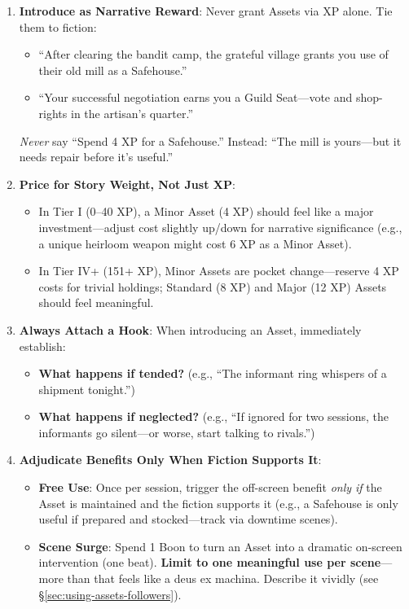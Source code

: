 \begin{enumerate}
  \item \textbf{Introduce as Narrative Reward}: Never grant Assets via XP alone. Tie them to fiction:  
        \begin{itemize}
          \item ``After clearing the bandit camp, the grateful village grants you use of their old mill as a Safehouse.''  
          \item ``Your successful negotiation earns you a Guild Seat---vote and shop-rights in the artisan's quarter.''  
        \end{itemize}
        \textit{Never} say ``Spend 4 XP for a Safehouse.'' Instead: ``The mill is yours---but it needs repair before it's useful.''  
  \item \textbf{Price for Story Weight, Not Just XP}:  
        \begin{itemize}
          \item In Tier I (0--40 XP), a Minor Asset (4 XP) should feel like a major investment---adjust cost slightly up/down for narrative significance (e.g., a unique heirloom weapon might cost 6 XP as a Minor Asset).  
          \item In Tier IV+ (151+ XP), Minor Assets are pocket change---reserve 4 XP costs for trivial holdings; Standard (8 XP) and Major (12 XP) Assets should feel meaningful.  
        \end{itemize}
  \item \textbf{Always Attach a Hook}: When introducing an Asset, immediately establish:  
        \begin{itemize}
          \item \textbf{What happens if tended?} (e.g., ``The informant ring whispers of a shipment tonight.'')  
          \item \textbf{What happens if neglected?} (e.g., ``If ignored for two sessions, the informants go silent---or worse, start talking to rivals.'')  
        \end{itemize}
  \item \textbf{Adjudicate Benefits Only When Fiction Supports It}:  
        \begin{itemize}
          \item \textbf{Free Use}: Once per session, trigger the off-screen benefit \emph{only if} the Asset is maintained and the fiction supports it (e.g., a Safehouse is only useful if prepared and stocked---track via downtime scenes).  
          \item \textbf{Scene Surge}: Spend 1 Boon to turn an Asset into a dramatic on-screen intervention (one beat). \textbf{Limit to one meaningful use per scene}---more than that feels like a deus ex machina. Describe it vividly (see \S\ref{sec:using-assets-followers}).  

\end{itemize}
\end{enumerate}
